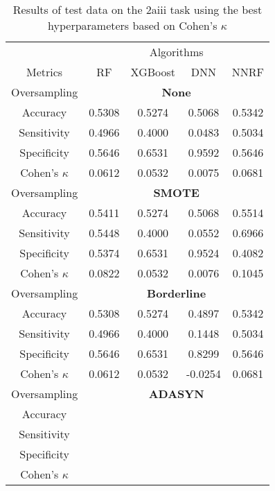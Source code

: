 \begin{table}[!htb]
\centering
\caption{Results of test data on the 2aiii task using the best hyperparameters based on Cohen's $\kappa$}
\label{tab:2aiii_test_results}
\begin{tabular}{c | c c c c}
\hline
 & \multicolumn{4}{c}{Algorithms}\\ 
Metrics &RF & XGBoost & DNN & NNRF\\ 
\hline
Oversampling &\multicolumn{4}{|c}{\textbf{None}}\\ 
\hline
Accuracy & 0.5308 & 0.5274 & 0.5068 & 0.5342\\ 
Sensitivity & 0.4966 & 0.4000 & 0.0483 & 0.5034\\ 
Specificity & 0.5646 & 0.6531 & 0.9592 & 0.5646\\ 
Cohen's $\kappa$ & 0.0612 & 0.0532 & 0.0075 & 0.0681\\ 
\hline
Oversampling &\multicolumn{4}{|c}{\textbf{SMOTE}}\\ 
\hline
Accuracy & 0.5411 & 0.5274 & 0.5068 & 0.5514\\ 
Sensitivity & 0.5448 & 0.4000 & 0.0552 & 0.6966\\ 
Specificity & 0.5374 & 0.6531 & 0.9524 & 0.4082\\ 
Cohen's $\kappa$ & 0.0822 & 0.0532 & 0.0076 & 0.1045\\ 
\hline
Oversampling &\multicolumn{4}{|c}{\textbf{Borderline}}\\ 
\hline
Accuracy & 0.5308 & 0.5274 & 0.4897 & 0.5342\\ 
Sensitivity & 0.4966 & 0.4000 & 0.1448 & 0.5034\\ 
Specificity & 0.5646 & 0.6531 & 0.8299 & 0.5646\\ 
Cohen's $\kappa$ & 0.0612 & 0.0532 & -0.0254 & 0.0681\\ 
\hline
Oversampling &\multicolumn{4}{|c}{\textbf{ADASYN}}\\ 
\hline
Accuracy &  &  &  & \\ 
Sensitivity &  &  &  & \\ 
Specificity &  &  &  & \\ 
Cohen's $\kappa$ &  &  &  & \\ 
\hline
\end{tabular}
\end{table}

